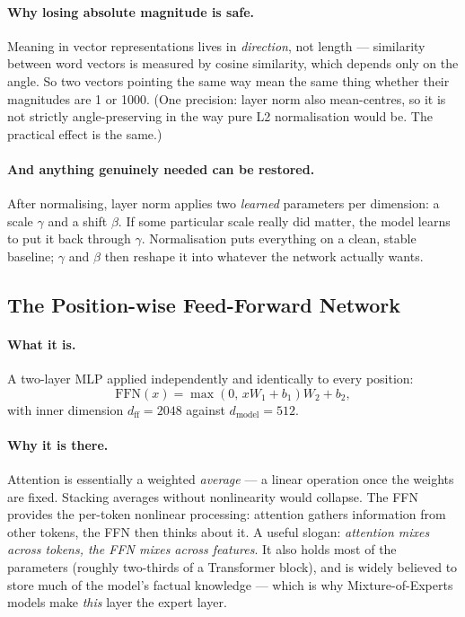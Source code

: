 \documentclass[11pt,a4paper]{article}
\begin{document}
\paragraph{Why losing absolute magnitude is safe.} Meaning in vector representations lives in
\emph{direction}, not length --- similarity between word vectors is measured by cosine
similarity, which depends only on the angle. So two vectors pointing the same way mean the
same thing whether their magnitudes are 1 or 1000. (One precision: layer norm also
mean-centres, so it is not strictly angle-preserving in the way pure L2 normalisation would
be. The practical effect is the same.)

\paragraph{And anything genuinely needed can be restored.} After normalising, layer norm
applies two \emph{learned} parameters per dimension: a scale $\gamma$ and a shift $\beta$. If
some particular scale really did matter, the model learns to put it back through $\gamma$.
Normalisation puts everything on a clean, stable baseline; $\gamma$ and $\beta$ then reshape
it into whatever the network actually wants.

\subsection{The Position-wise Feed-Forward Network}

\paragraph{What it is.} A two-layer MLP applied independently and identically to every
position:
\[
\mathrm{FFN}(x) = \max(0,\, xW_1 + b_1)W_2 + b_2 ,
\]
with inner dimension $d_{\text{ff}} = 2048$ against $d_{\text{model}} = 512$.

\paragraph{Why it is there.} Attention is essentially a weighted \emph{average} --- a linear
operation once the weights are fixed. Stacking averages without nonlinearity would collapse.
The FFN provides the per-token nonlinear processing: attention gathers information from
other tokens, the FFN then thinks about it. A useful slogan: \emph{attention mixes across
tokens, the FFN mixes across features}. It also holds most of the parameters (roughly
two-thirds of a Transformer block), and is widely believed to store much of the model's
factual knowledge --- which is why Mixture-of-Experts models make \emph{this} layer the
expert layer.
\end{document}
